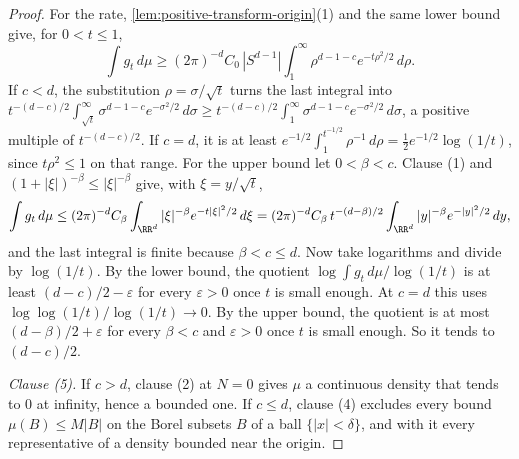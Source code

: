 \begin{proof}
For the rate, \ref{lem:positive-transform-origin}(1) and the same lower bound give, for
$0 < t \le 1$,
\[
  \int g_t\,d\mu \ge (2\pi)^{-d}C_0\,|S^{d-1}|\int_1^\infty \rho^{d-1-c}e^{-t\rho^2/2}\,d\rho .
\]
If $c < d$, the substitution $\rho = \sigma/\sqrt t$ turns the last integral into
$t^{-(d-c)/2}\int_{\sqrt t}^\infty\sigma^{d-1-c}e^{-\sigma^2/2}\,d\sigma \ge
t^{-(d-c)/2}\int_1^\infty\sigma^{d-1-c}e^{-\sigma^2/2}\,d\sigma$, a positive multiple of
$t^{-(d-c)/2}$. If $c = d$, it is at least
$e^{-1/2}\int_1^{t^{-1/2}}\rho^{-1}\,d\rho = \tfrac12 e^{-1/2}\log(1/t)$, since
$t\rho^2 \le 1$ on that range. For the upper bound let $0 < \beta < c$. Clause (1) and
$(1+|\xi|)^{-\beta} \le |\xi|^{-\beta}$ give, with $\xi = y/\sqrt t$,
\[
  \int g_t\,d\mu \le (2\pi)^{-d}C_\beta\int_{\RR^d}|\xi|^{-\beta}e^{-t|\xi|^2/2}\,d\xi
   = (2\pi)^{-d}C_\beta\,t^{-(d-\beta)/2}\int_{\RR^d}|y|^{-\beta}e^{-|y|^2/2}\,dy ,
\]
and the last integral is finite because $\beta < c \le d$. Now take logarithms and divide by
$\log(1/t)$. By the lower bound, the quotient $\log\int g_t\,d\mu/\log(1/t)$ is at least
$(d-c)/2 - \varepsilon$ for every $\varepsilon > 0$ once $t$ is small enough. At $c = d$ this
uses $\log\log(1/t)/\log(1/t) \to 0$. By the upper bound, the quotient is at most
$(d-\beta)/2 + \varepsilon$ for every $\beta < c$ and $\varepsilon > 0$ once $t$ is small enough. So it
tends to $(d-c)/2$.

\emph{Clause (5).} If $c > d$, clause (2) at $N = 0$ gives $\mu$ a continuous density that tends
to $0$ at infinity, hence a bounded one. If $c \le d$, clause (4) excludes every bound
$\mu(B) \le M|B|$ on the Borel subsets $B$ of a ball $\{|x| < \delta\}$, and with it every
representative of a density bounded near the origin.
\end{proof}

